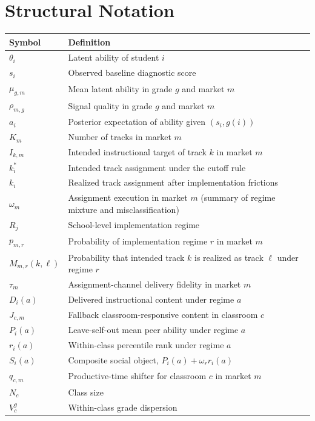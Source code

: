 \documentclass[11pt]{article}
\begin{document}
\section{Structural Notation}
\label{app:struct_notation}

\begin{longtable}{p{2.5cm}p{11cm}}
\toprule
Symbol & Definition \\
\midrule
$\theta_i$ & Latent ability of student $i$ \\
$s_i$ & Observed baseline diagnostic score \\
$\mu_{g,m}$ & Mean latent ability in grade $g$ and market $m$ \\
$\rho_{m,g}$ & Signal quality in grade $g$ and market $m$ \\
$a_i$ & Posterior expectation of ability given $(s_i,g(i))$ \\
$K_m$ & Number of tracks in market $m$ \\
$I_{k,m}$ & Intended instructional target of track $k$ in market $m$ \\
$k_i^*$ & Intended track assignment under the cutoff rule \\
$k_i$ & Realized track assignment after implementation frictions \\
$\omega_m$ & Assignment execution in market $m$ (summary of regime mixture and misclassification) \\
$R_j$ & School-level implementation regime \\
$p_{m,r}$ & Probability of implementation regime $r$ in market $m$ \\
$M_{m,r}(k,\ell)$ & Probability that intended track $k$ is realized as track $\ell$ under regime $r$ \\
$\tau_m$ & Assignment-channel delivery fidelity in market $m$ \\
$D_i(a)$ & Delivered instructional content under regime $a$ \\
$J_{c,m}$ & Fallback classroom-responsive content in classroom $c$ \\
$P_i(a)$ & Leave-self-out mean peer ability under regime $a$ \\
$r_i(a)$ & Within-class percentile rank under regime $a$ \\
$S_i(a)$ & Composite social object, $P_i(a)+\omega_r r_i(a)$ \\
$q_{c,m}$ & Productive-time shifter for classroom $c$ in market $m$ \\
$N_c$ & Class size \\
$V_c^g$ & Within-class grade dispersion \\

\end{longtable}
\end{document}
